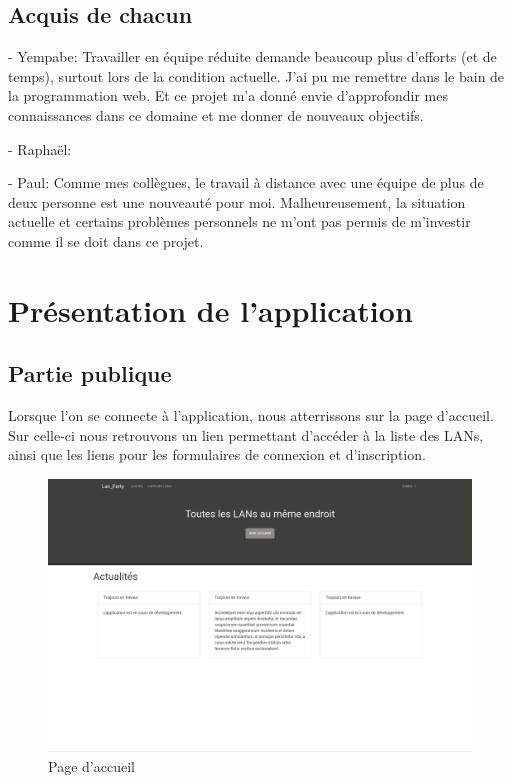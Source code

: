 \documentclass[12pt]{article}
\begin{document}
\subsection{Acquis de chacun}

- Yempabe: Travailler en équipe réduite demande beaucoup plus d'efforts (et de temps), surtout lors de la condition actuelle. J'ai pu me remettre dans le bain de la programmation web. Et ce projet m'a donné envie d'approfondir mes connaissances dans ce domaine et me donner de nouveaux objectifs.


- Raphaël:


- Paul: Comme mes collègues, le travail à distance avec une équipe de plus de deux personne est une nouveauté pour moi. Malheureusement, la situation actuelle et certains problèmes personnels ne m'ont pas permis de m'investir comme il se doit dans ce projet.
\newpage

\section{Présentation de l'application}

\subsection{Partie publique}
Lorsque l'on se connecte à l'application, nous atterrissons sur la page d'accueil. Sur celle-ci nous retrouvons un lien permettant d'accéder à la liste des LANs, ainsi que les liens pour les formulaires de connexion et d'inscription.

\begin{figure}[H]
\centering
\includegraphics[scale=0.20]{images/accueil.png}
\caption{Page d'accueil}
\label{}
\end{figure}
\end{document}
